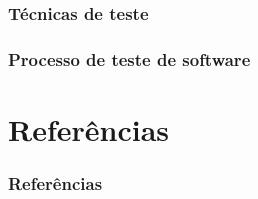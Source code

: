 \documentclass[utf8, usepdftitle=false, svgnames, color={table,
fixpdftex, hyperref, fixinclude, xcdraw}, t, brazil]{beamer}
\begin{document}
 \section{Técnicas de teste}
  
 
 \section{Processo de teste de software}
  
 
 \part{Referências}
 
 \section{Referências}
 
\end{document}
